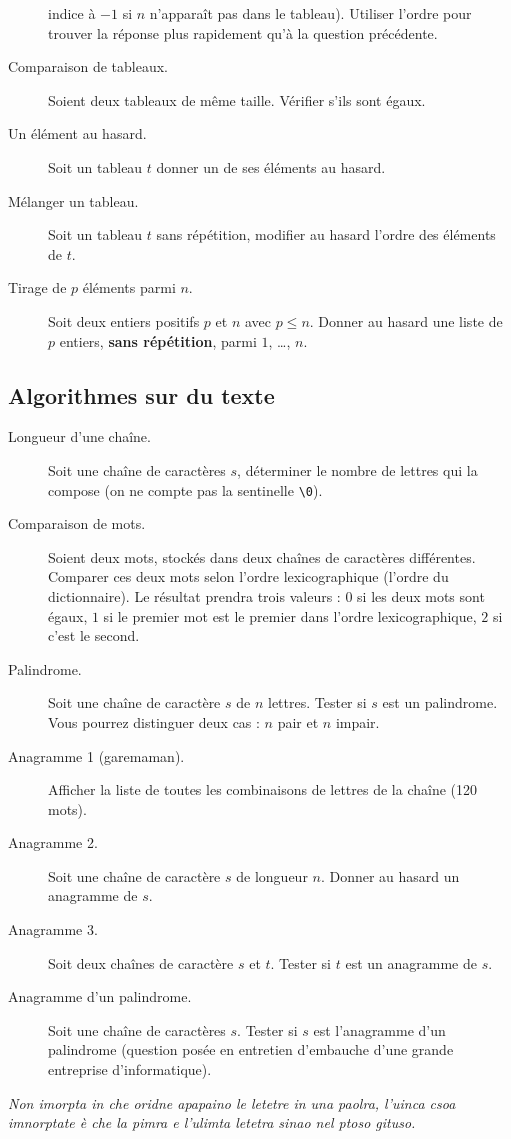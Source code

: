 \begin{description}
  indice à $-1$ si $n$ n'apparaît pas dans le tableau). Utiliser l'ordre
  pour trouver la réponse plus rapidement qu'à la question précédente.
\item[Comparaison de tableaux.] Soient deux tableaux de même
  taille. Vérifier s'ils sont égaux. 
\item[Un élément au hasard.] Soit un tableau $t$ donner un de ses
  éléments au hasard.
\item[Mélanger un tableau.] Soit un tableau $t$ sans
  répétition, modifier au hasard l'ordre des éléments de $t$.
\item[Tirage de $p$ éléments parmi $n$.] Soit deux entiers positifs $p$ et $n$
  avec $p \leq n$. Donner au hasard une liste de $p$ entiers, \textbf{sans répétition}, parmi
  $1$, \ldots, $n$. 
\end{description}
\subsection{Algorithmes sur du texte}
\begin{description}
\item[Longueur d'une chaîne.] Soit une chaîne de caractères $s$,
  déterminer le nombre de lettres qui la compose (on ne compte pas la
  sentinelle \verb|\0|). 
\item[Comparaison de mots.] Soient deux mots, stockés dans deux
  chaînes de caractères différentes.  Comparer ces deux mots selon
  l'ordre lexicographique (l'ordre du dictionnaire). Le résultat
  prendra trois valeurs : $0$ si les deux mots sont égaux, $1$  si le
  premier mot est le premier dans l'ordre lexicographique, $2$ si c'est
  le second.
  \item[Palindrome.] Soit une chaîne de caractère $s$ de $n$ lettres. Tester si $s$
    est un palindrome. Vous pourrez distinguer deux cas : $n$ pair
    et $n$ impair.
\item[Anagramme 1 (garemaman).] Afficher la liste
  de toutes les combinaisons de lettres de la chaîne  (120 mots).
\item[Anagramme 2.] Soit une chaîne de caractère $s$ de longueur
  $n$. Donner au hasard un anagramme de $s$.
\item[Anagramme 3.] Soit deux chaînes de caractère $s$ et $t$. Tester
  si $t$ est un anagramme de $s$.
\item[Anagramme d'un palindrome.] Soit une chaîne de caractères
  $s$. Tester si $s$ est l'anagramme d'un palindrome (question posée
  en entretien d'embauche d'une grande entreprise d'informatique).
\end{description}

\emph{Non imorpta in che oridne apapaino le letetre in una paolra, l'uinca csoa imnorptate è che la pimra e l'ulimta letetra sinao nel ptoso gituso.}


